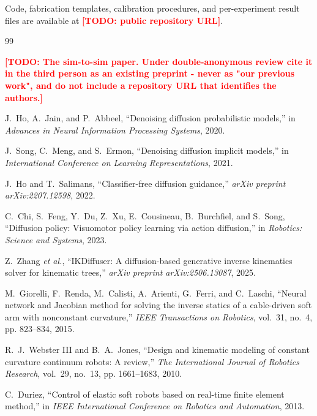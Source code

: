 \documentclass[letterpaper, 10pt, conference]{ieeeconf}
\newif\ifanonymous
\newcommand{\todo}[1]{\textcolor{red}{\textbf{[TODO: #1]}}}
\begin{document}
\ifanonymous
Code, fabrication templates, calibration procedures, and per-experiment result
files are available in an anonymized repository:
\todo{anonymous.4open.science mirror URL - mint it from a fresh branch}.
\else
Code, fabrication templates, calibration procedures, and per-experiment result
files are available at \todo{public repository URL}.
\fi

\begin{thebibliography}{99}

\todo{The sim-to-sim paper. Under double-anonymous review cite it in the
third person as an existing preprint - never as "our previous work", and do
not include a repository URL that identifies the authors.}

J.~Ho, A.~Jain, and P.~Abbeel, ``Denoising diffusion probabilistic models,''
in \emph{Advances in Neural Information Processing Systems}, 2020.

J.~Song, C.~Meng, and S.~Ermon, ``Denoising diffusion implicit models,'' in
\emph{International Conference on Learning Representations}, 2021.

J.~Ho and T.~Salimans, ``Classifier-free diffusion guidance,'' \emph{arXiv
preprint arXiv:2207.12598}, 2022.

C.~Chi, S.~Feng, Y.~Du, Z.~Xu, E.~Cousineau, B.~Burchfiel, and S.~Song,
``Diffusion policy: Visuomotor policy learning via action diffusion,'' in
\emph{Robotics: Science and Systems}, 2023.

Z.~Zhang \emph{et al.}, ``IKDiffuser: A diffusion-based generative inverse
kinematics solver for kinematic trees,'' \emph{arXiv preprint
arXiv:2506.13087}, 2025.

M.~Giorelli, F.~Renda, M.~Calisti, A.~Arienti, G.~Ferri, and C.~Laschi,
``Neural network and Jacobian method for solving the inverse statics of a
cable-driven soft arm with nonconstant curvature,'' \emph{IEEE Transactions
on Robotics}, vol.~31, no.~4, pp. 823--834, 2015.

R.~J.~Webster III and B.~A.~Jones, ``Design and kinematic modeling of constant
curvature continuum robots: A review,'' \emph{The International Journal of
Robotics Research}, vol.~29, no.~13, pp. 1661--1683, 2010.

C.~Duriez, ``Control of elastic soft robots based on real-time finite element
method,'' in \emph{IEEE International Conference on Robotics and Automation},
2013.


\end{thebibliography}
\end{document}
